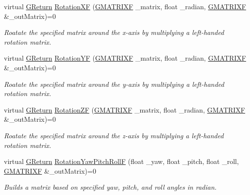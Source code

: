 \begin{DoxyCompactItemize}
virtual \hyperlink{namespaceGW_a67a839e3df7ea8a5c5686613a7a3de21}{G\+Return} \hyperlink{classGW_1_1MATH_1_1GMatrix_acd8ef29804a2d807876b2f0a22a1f9b4}{Rotation\+XF} (\hyperlink{structGW_1_1MATH_1_1GMATRIXF}{G\+M\+A\+T\+R\+I\+XF} \+\_\+matrix, float \+\_\+radian, \hyperlink{structGW_1_1MATH_1_1GMATRIXF}{G\+M\+A\+T\+R\+I\+XF} \&\+\_\+out\+Matrix)=0
\begin{DoxyCompactList}\small\item\em Roatate the specified matrix around the x-\/axis by multiplying a left-\/handed rotation matrix. \end{DoxyCompactList}\item 
virtual \hyperlink{namespaceGW_a67a839e3df7ea8a5c5686613a7a3de21}{G\+Return} \hyperlink{classGW_1_1MATH_1_1GMatrix_afe5fa5399691dc690272dad5d3697ff9}{Rotation\+YF} (\hyperlink{structGW_1_1MATH_1_1GMATRIXF}{G\+M\+A\+T\+R\+I\+XF} \+\_\+matrix, float \+\_\+radian, \hyperlink{structGW_1_1MATH_1_1GMATRIXF}{G\+M\+A\+T\+R\+I\+XF} \&\+\_\+out\+Matrix)=0
\begin{DoxyCompactList}\small\item\em Roatate the specified matrix around the y-\/axis by multiplying a left-\/handed rotation matrix. \end{DoxyCompactList}\item 
virtual \hyperlink{namespaceGW_a67a839e3df7ea8a5c5686613a7a3de21}{G\+Return} \hyperlink{classGW_1_1MATH_1_1GMatrix_abce415225da8aa2592e1ef495fd9996b}{Rotation\+ZF} (\hyperlink{structGW_1_1MATH_1_1GMATRIXF}{G\+M\+A\+T\+R\+I\+XF} \+\_\+matrix, float \+\_\+radian, \hyperlink{structGW_1_1MATH_1_1GMATRIXF}{G\+M\+A\+T\+R\+I\+XF} \&\+\_\+out\+Matrix)=0
\begin{DoxyCompactList}\small\item\em Roatate the specified matrix around the z-\/axis by multiplying a left-\/handed rotation matrix. \end{DoxyCompactList}\item 
virtual \hyperlink{namespaceGW_a67a839e3df7ea8a5c5686613a7a3de21}{G\+Return} \hyperlink{classGW_1_1MATH_1_1GMatrix_a821ff1b8cda633278f4d0088d2063d4d}{Rotation\+Yaw\+Pitch\+RollF} (float \+\_\+yaw, float \+\_\+pitch, float \+\_\+roll, \hyperlink{structGW_1_1MATH_1_1GMATRIXF}{G\+M\+A\+T\+R\+I\+XF} \&\+\_\+out\+Matrix)=0
\begin{DoxyCompactList}\small\item\em Builds a matrix based on specified yaw, pitch, and roll angles in radian. \end{DoxyCompactList}\item 

\end{DoxyCompactItemize}
